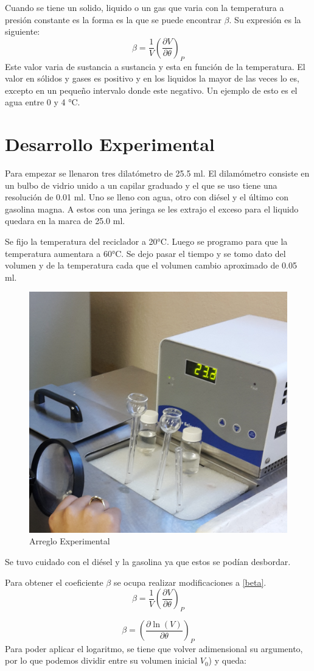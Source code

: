 \documentclass[12pt]{article}
\begin{document}
\hspace{0.75cm} Cuando se tiene un solido, liquido o un gas que varia con la temperatura a presión constante es la forma es la que se puede encontrar $\beta$. Su expresión es la siguiente:
\begin{equation}\label{beta}
	\beta = \frac{1}{V} \left(\frac{\partial V}{\partial \theta} \right)_{P}	
\end{equation}
Este valor varia de sustancia a sustancia y esta en función de la temperatura. El valor en sólidos y gases es positivo y en los liquidos la mayor de las veces lo es, excepto en un pequeño intervalo donde este negativo. Un ejemplo de esto es el agua entre 0 y 4 °C.
\section{Desarrollo Experimental}
Para empezar se llenaron tres dilatómetro de 25.5 ml. El dilamómetro consiste en un bulbo de vidrio unido a un capilar graduado y el que se uso tiene una resolución de 0.01 ml. Uno se lleno con agua, otro con diésel y el último con gasolina magna. A estos con una jeringa se les extrajo el exceso para el liquido quedara en la marca de 25.0 ml. 

\hspace{0.75cm} Se fijo la temperatura del reciclador a 20°C. Luego se programo para que la temperatura aumentara a 60°C. Se dejo pasar el tiempo y se tomo dato del volumen y de la temperatura cada que el volumen cambio aproximado de 0.05 ml.
\begin{figure}[H]
\centering
\includegraphics[width=0.25\linewidth]{setup.png}
\caption{Arreglo Experimental}
\end{figure}

Se tuvo cuidado con el diésel y la gasolina ya que estos se podían desbordar.

Para obtener el coeficiente $\beta$ se ocupa realizar modificaciones a \eqref{beta}.
$$\beta = \frac{1}{V} \left(\frac{\partial V}{\partial \theta} \right)_{P}$$


\begin{equation}\label{bet}
\beta = \left(\frac{\partial \ln (V)}{\partial \theta} \right)_{P}
\end{equation}
Para poder aplicar el logaritmo, se tiene que volver adimensional su argumento, por lo que podemos dividir entre su volumen inicial $V_0$) y queda:
\end{document}
